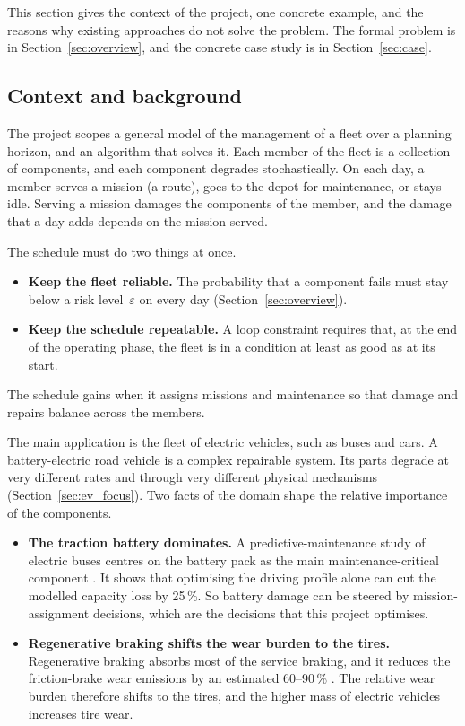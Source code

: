 \documentclass[11pt,a4paper]{article}
\theoremstyle{plain}
\theoremstyle{definition}
\theoremstyle{remark}
\begin{document}
This section gives the context of the project, one concrete example, and the reasons why existing approaches do not solve the problem.
The formal problem is in Section~\ref{sec:overview}, and the concrete case study is in Section~\ref{sec:case}.

\subsection{Context and background}

The project scopes a general model of the management of a fleet over a planning horizon, and an algorithm that solves it.
Each member of the fleet is a collection of components, and each component degrades stochastically.
On each day, a member serves a mission (a route), goes to the depot for maintenance, or stays idle.
Serving a mission damages the components of the member, and the damage that a day adds depends on the mission served.

The schedule must do two things at once.
\begin{itemize}
  \item \textbf{Keep the fleet reliable.} The probability that a component fails must stay below a risk level~$\varepsilon$ on every day (Section~\ref{sec:overview}).
  \item \textbf{Keep the schedule repeatable.} A loop constraint requires that, at the end of the operating phase, the fleet is in a condition at least as good as at its start.
\end{itemize}
The schedule gains when it assigns missions and maintenance so that damage and repairs balance across the members.

The main application is the fleet of electric vehicles, such as buses and cars.
A battery-electric road vehicle is a complex repairable system.
Its parts degrade at very different rates and through very different physical mechanisms (Section~\ref{sec:ev_focus}).
Two facts of the domain shape the relative importance of the components.
\begin{itemize}
  \item \textbf{The traction battery dominates.}
    A predictive-maintenance study of electric buses centres on the battery pack as the main maintenance-critical component \cite[Secs.~2,~4.2]{Ibrahim2025}.
    It shows that optimising the driving profile alone can cut the modelled capacity loss by 25\,\%.
    So battery damage can be steered by mission-assignment decisions, which are the decisions that this project optimises.
  \item \textbf{Regenerative braking shifts the wear burden to the tires.}
    Regenerative braking absorbs most of the service braking, and it reduces the friction-brake wear emissions by an estimated 60--90\,\% \cite[Sec.~6.1]{Fussell2022}.
    The relative wear burden therefore shifts to the tires, and the higher mass of electric vehicles increases tire wear.
\end{itemize}
\end{document}
